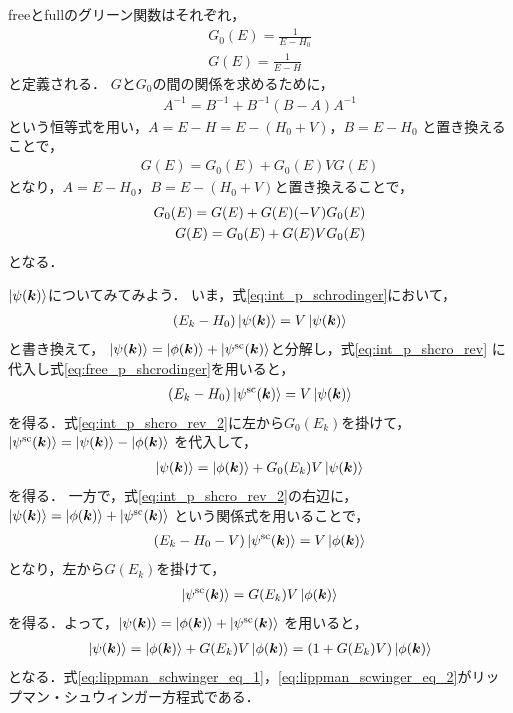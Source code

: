 \documentclass[a4paper,11pt]{ltjsarticle}
\numberwithin{equation}{section}
\begin{document}
freeとfullのグリーン関数はそれぞれ，
\begin{align}\label{eq:def_green_fnc}
  G_0(E) = \frac{1}{E - H_0} \\
  G(E) = \frac{1}{E- H}
\end{align}
と定義される．
$G$と$G_0$の間の関係を求めるために，
\begin{align*}
  A^{-1} = B^{-1} + B^{-1}(B-A)A^{-1}
\end{align*}
という恒等式を用い，$A = E-H = E - (H_0 + V)$，$B = E - H_0$
と置き換えることで，
\begin{align}\label{eq:G_equal_G_0_equation}
  G(E) = G_0(E) + G_0(E)V G(E)
\end{align}
となり，$A = E - H_0$，$B = E-(H_0 +V)$と置き換えることで，
\begin{align}\label{eq:G_0_equal_G_equation}
  G_0(E) = G(E) + G(E)(-V)G_0(E) \notag \\
  G(E) = G_0(E) + G(E) V G_0(E)  
\end{align}
となる．

$\ket{\psi(\bm{k})}$についてみてみよう．
いま，式\ref{eq:int_p_schrodinger}において，
\begin{align}\label{eq:int_p_shcro_rev}
  (E_k-H_0) \ket{\psi(\bm{k})} = V \ket{\psi(\bm{k})}
\end{align}
と書き換えて，
$\ket{\psi(\bm{k})} = \ket{\phi(\bm{k})} + \ket{\psi^\mathrm{sc} (\bm{k})}$と分解し，式\ref{eq:int_p_shcro_rev}
に代入し式\ref{eq:free_p_shcrodinger}を用いると，
\begin{align}\label{eq:int_p_shcro_rev_2}
  (E_k - H_0) \ket{\psi^\mathrm{sc}(\bm{k})} = V \ket{\psi(\bm{k})}
\end{align}
を得る．式\ref{eq:int_p_shcro_rev_2}に左から$G_0(E_k)$を掛けて，
$\ket{\psi^\mathrm{sc}(\bm{k})} = \ket{\psi (\bm{k})} - \ket{\phi(\bm{k})}$
を代入して，
\begin{align}\label{eq:lippman_schwinger_eq_1}
  \ket{\psi(\bm{k})} = \ket{\phi(\bm{k})} + G_0(E_k) V \ket{\psi(\bm{k})}
\end{align}
を得る．
一方で，式\ref{eq:int_p_shcro_rev_2}の右辺に，$\ket{\psi(\bm{k})} = \ket{\phi(\bm{k})} + \ket{\psi^\mathrm{sc} (\bm{k})}$
という関係式を用いることで，
\begin{align}\label{eq:inti_p_shcro_rev_3}
  (E_k - H_0 - V) \ket{\psi^\mathrm{sc}(\bm{k})} = V \ket{\phi(\bm{k})}
\end{align}
となり，左から$G(E_k)$を掛けて，
\begin{align*}
  \ket{\psi^\mathrm{sc}(\bm{k})} = G(E_k) V \ket{\phi(\bm{k})}
\end{align*}
を得る．よって，$\ket{\psi(\bm{k})} = \ket{\phi(\bm{k})} + \ket{\psi^\mathrm{sc} (\bm{k})}$
を用いると，
\begin{align}\label{eq:lippman_scwinger_eq_2}
  \ket{\psi(\bm{k})} = \ket{\phi(\bm{k})} + G(E_k) V \ket{\phi(\bm{k})} = (1 + G(E_k) V) \ket{\phi(\bm{k})}
\end{align}
となる．式\ref{eq:lippman_schwinger_eq_1}，\ref{eq:lippman_scwinger_eq_2}がリップマン・シュウィンガー方程式である．
\end{document}
